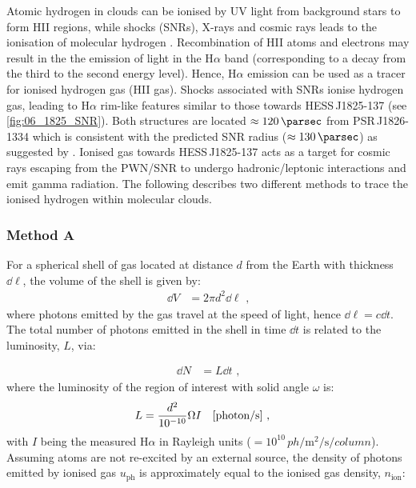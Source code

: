 Atomic hydrogen in clouds can be ionised by UV light from background stars to form HII regions, while shocks (SNRs), X-rays and cosmic rays leads to the ionisation of molecular hydrogen \citep{2011piim.book.....D}. Recombination of HII atoms and electrons may result in the the emission of light in the H$\alpha$ band (corresponding to a decay from the third to the second energy level). Hence, H$\alpha$ emission can be used as a tracer for ionised hydrogen gas (HII gas). Shocks associated with SNRs ionise hydrogen gas, leading to H$\alpha$ rim-like features similar to those towards \mbox{HESS\,J1825-137} (see \autoref{fig:06_1825_SNR}). Both structures are located $\approx 120\,\pc$ from \mbox{PSR\,J1826-1334} which is consistent with the predicted SNR radius ($\approx 130\,\pc$) as suggested by \cite{deJager2009}.
\newpar
Ionised gas towards \mbox{HESS\,J1825-137} acts as a target for cosmic rays escaping from the PWN/SNR to undergo hadronic/leptonic interactions and emit gamma radiation. The following describes two different methods to trace the ionised hydrogen within molecular clouds.

\subsubsection{Method A}

For a spherical shell of gas located at distance $d$ from the Earth with thickness $\dd{\ell}$, the volume of the shell is given by:
\begin{equation}
    \begin{aligned}
        \dd{V}&=2\pi d^2 \dd{\ell}\text{ ,}
    \end{aligned}
\end{equation}
\noindent where photons emitted by the gas travel at the speed of light, hence $\dd{\ell}=c\dd{t}$. The total number of photons emitted in the shell in time $\dd{t}$ is related to the luminosity, $L$, via:

\begin{equation}
    \begin{aligned}
        \dd{N}&=L\dd{t}\text{ ,}
    \end{aligned}
\end{equation}
\noindent where the luminosity of the region of interest with solid angle $\omega$ is:
\begin{equation}
    \begin{aligned}
        L&=\frac{d^2}{10^{-10}}\Omega I\quad \qty[\text{photon/s}]\text{ ,}
    \end{aligned}
\end{equation}
\noindent with $I$ being the measured H$\alpha$ in Rayleigh units ($=10^{10}\,\si{ph\per\meter\squared\per\second\per{column}}$). Assuming atoms are not re-excited by an external source, the density of photons emitted by ionised gas $u_\text{ph}$ is approximately equal to the ionised gas density, $n_\text{ion}$:

